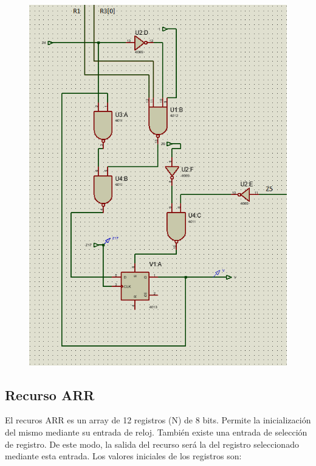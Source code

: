 \documentclass[12pt,a4paper,oneside]{article}
\begin{document}
\begin{figure}[H]
    \includegraphics[width = \textwidth]{proteus-img/circuito-v-etiquetado.png}
\end{figure}

\subsection{Recurso ARR}
El recuros ARR es un array de 12 registros (N) de 8 bits. Permite la inicialización del mismo mediante su entrada 
de reloj. También existe una entrada de selección de registro. De este modo, la salida del recurso será la del registro 
seleccionado mediante esta entrada. Los valores iniciales de los registros son:
\end{document}
